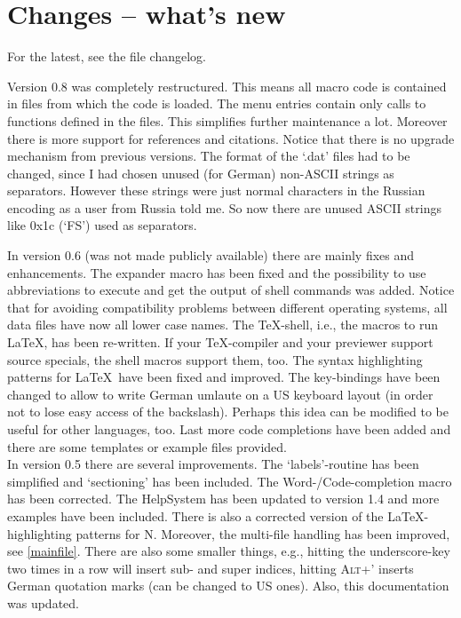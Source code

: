 \documentclass{article}
\newcommand{\nedit}{N\kern-0.8pt{Edit}}
\newcommand{\keyname}[1]{\textsc{#1}}
\begin{document}
\newpage
\section{Changes -- what's new}\label{latest}
For the latest, see the file changelog.

Version 0.8 was completely restructured. This means all macro code is contained in files from which the code is loaded. The menu entries contain only calls to functions defined in the files. This simplifies further maintenance a lot. Moreover there is more support for references and citations. Notice that there is no upgrade mechanism from previous versions. The format of the `.dat' files had to be changed, since I had chosen unused (for German) non-ASCII strings as separators. However these strings were just normal characters in the Russian encoding as a user from Russia told me. So now there are unused ASCII strings like 0x1c (`FS') used as separators.

In version 0.6 (was not made publicly available) there are mainly fixes and enhancements. The expander macro has been fixed and the possibility to use abbreviations to execute and get the output of shell commands was added. Notice that for avoiding compatibility problems between different operating systems, all data files have now all lower case names. The \TeX-shell, i.e., the macros to run \LaTeX, has been re-written. If your \TeX-compiler and your previewer support source specials, the shell macros support them, too. The syntax highlighting patterns for \LaTeX\ have been fixed and improved. The key-bindings have been changed to allow to write German umlaute on a US keyboard layout (in order not to lose easy access of the backslash). Perhaps this idea can be modified to be useful for other languages, too. Last more code completions have been added and there are some templates or example files provided.\\

In version 0.5 there are several improvements. The `labels'-routine has been simplified and `sectioning' has been included. The Word-/Code-completion macro has been corrected. The HelpSystem has been updated to version 1.4 and more examples have been included. There is also a corrected version of the \LaTeX-highlighting patterns for \nedit. Moreover, the multi-file handling has been improved, see \ref{mainfile}. There are also some smaller things, e.g., hitting the underscore-key two times in a row will insert sub- and super indices, hitting \keyname{Alt+'} inserts German quotation marks (can be changed to US ones). Also, this documentation was updated.
\end{document}
